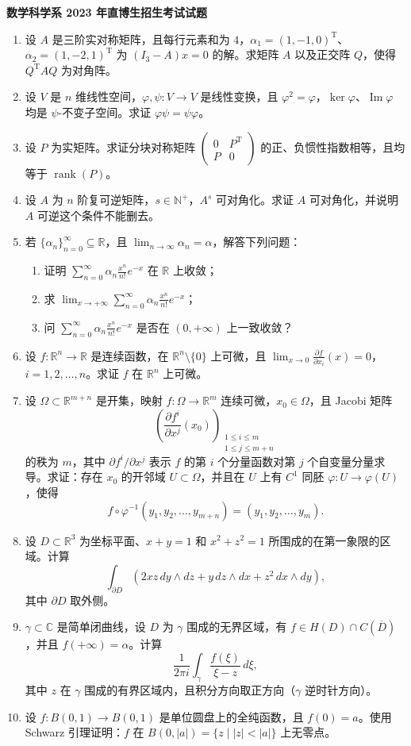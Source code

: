 \documentclass[UTF8,11pt,fontset=none]{ctexart}
\newcommand{\paperheading}[1]{\begin{center}\Large\bfseries #1\end{center}\vspace{.45em}}
\newcommand{\newpaper}[1]{\clearpage\paperheading{#1}}
\begin{document}
\newpaper{数学科学系 2023 年直博生招生考试试题}
\begin{enumerate}
\item 设 $A$ 是三阶实对称矩阵，且每行元素和为 $4$，$\alpha_1=(1,-1,0)^{\mathrm T}$、$\alpha_2=(1,-2,1)^{\mathrm T}$ 为 $(I_3-A)x=0$ 的解。求矩阵 $A$ 以及正交阵 $Q$，使得 $Q^{\mathrm T}AQ$ 为对角阵。
\item 设 $V$ 是 $n$ 维线性空间，$\varphi,\psi:V\to V$ 是线性变换，且 $\varphi^2=\varphi$，$\ker\varphi$、$\operatorname{Im}\varphi$ 均是 $\psi$-不变子空间。求证 $\varphi\psi=\psi\varphi$。
\item 设 $P$ 为实矩阵。求证分块对称矩阵
$\begin{pmatrix}0&P^{\mathrm T}\\P&0\end{pmatrix}$
的正、负惯性指数相等，且均等于 $\operatorname{rank}(P)$。
\item 设 $A$ 为 $n$ 阶复可逆矩阵，$s\in\mathbb N^+$，$A^s$ 可对角化。求证 $A$ 可对角化，并说明 $A$ 可逆这个条件不能删去。
\item 若 $\{\alpha_n\}_{n=0}^{\infty}\subseteq\mathbb R$，且 $\lim_{n\to\infty}\alpha_n=\alpha$，解答下列问题：
\begin{enumerate}
\item 证明 $\displaystyle\sum_{n=0}^{\infty}\alpha_n\frac{x^n}{n!}e^{-x}$ 在 $\mathbb R$ 上收敛；
\item 求 $\displaystyle\lim_{x\to+\infty}\sum_{n=0}^{\infty}\alpha_n\frac{x^n}{n!}e^{-x}$；
\item 问 $\displaystyle\sum_{n=0}^{\infty}\alpha_n\frac{x^n}{n!}e^{-x}$ 是否在 $(0,+\infty)$ 上一致收敛？
\end{enumerate}
\item 设 $f:\mathbb R^n\to\mathbb R$ 是连续函数，在 $\mathbb R^n\setminus\{0\}$ 上可微，且
$\displaystyle\lim_{x\to0}\frac{\partial f}{\partial x_i}(x)=0$，$i=1,2,\ldots,n$。求证 $f$ 在 $\mathbb R^n$ 上可微。
\item 设 $\Omega\subset\mathbb R^{m+n}$ 是开集，映射 $f:\Omega\to\mathbb R^m$ 连续可微，$x_0\in\Omega$，且 Jacobi 矩阵
\[
\left(\frac{\partial f^i}{\partial x^j}(x_0)\right)_{\substack{1\le i\le m\\1\le j\le m+n}}
\]
的秩为 $m$，其中 $\partial f^i/\partial x^j$ 表示 $f$ 的第 $i$ 个分量函数对第 $j$ 个自变量分量求导。求证：存在 $x_0$ 的开邻域 $U\subset\Omega$，并且在 $U$ 上有 $C^1$ 同胚 $\varphi:U\to\varphi(U)$，使得
\[
f\circ\varphi^{-1}(y_1,y_2,\ldots,y_{m+n})=(y_1,y_2,\ldots,y_m).
\]
\item 设 $D\subset\mathbb R^3$ 为坐标平面、$x+y=1$ 和 $x^2+z^2=1$ 所围成的在第一象限的区域。计算
\[
\int_{\partial D}\left(2xz\,dy\wedge dz+y\,dz\wedge dx+z^2\,dx\wedge dy\right),
\]
其中 $\partial D$ 取外侧。
\item $\gamma\subset\mathbb C$ 是简单闭曲线，设 $D$ 为 $\gamma$ 围成的无界区域，有 $f\in H(D)\cap C(\overline D)$，并且 $f(+\infty)=\alpha$。计算
\[
\frac1{2\pi i}\int_\gamma\frac{f(\xi)}{\xi-z}\,d\xi,
\]
其中 $z$ 在 $\gamma$ 围成的有界区域内，且积分方向取正方向（$\gamma$ 逆时针方向）。
\item 设 $f:B(0,1)\to B(0,1)$ 是单位圆盘上的全纯函数，且 $f(0)=a$。使用 Schwarz 引理证明：$f$ 在 $B(0,|a|)=\{z\mid |z|<|a|\}$ 上无零点。
\end{enumerate}
\end{document}
